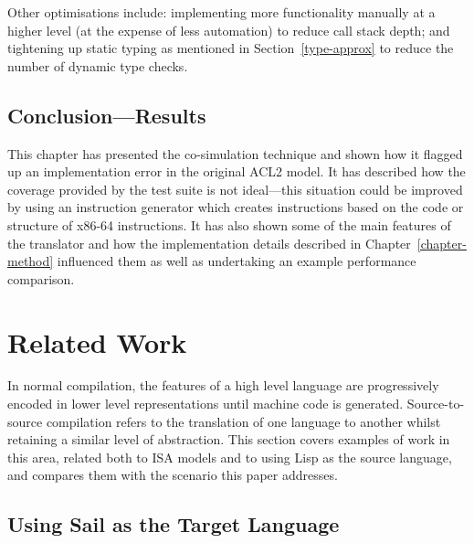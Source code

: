 \documentclass[a4paper,12pt,twoside,openright]{report}
\begin{document}
Other optimisations include: implementing more functionality manually at a higher level (at the expense of less automation) to reduce call stack depth; and tightening up static typing as mentioned in Section~\ref{type-approx} to reduce the number of dynamic type checks.


\section{Conclusion---Results}

This chapter has presented the co-simulation technique and shown how it flagged up an implementation error in the original ACL2 model.  It has described how the coverage provided by the test suite is not ideal---this situation could be improved by using an instruction generator which creates instructions based on the code or structure of x86-64 instructions.  It has also shown some of the main features of the translator and how the implementation details described in Chapter~\ref{chapter-method} influenced them as well as undertaking an example performance comparison.

\hypertarget{chapter-related}{
\chapter{Related Work}\label{chapter-related}}

In normal compilation, the features of a high level language are progressively encoded in lower level representations until machine code is generated.  Source-to-source compilation refers to the translation of one language to another whilst retaining a similar level of abstraction.  This section covers examples of work in this area, related both to ISA models and to using Lisp as the source language, and compares them with the scenario this paper addresses.

\hypertarget{sail-as-target}{
\section{Using Sail as the Target Language}\label{sail-as-target}}
\end{document}
